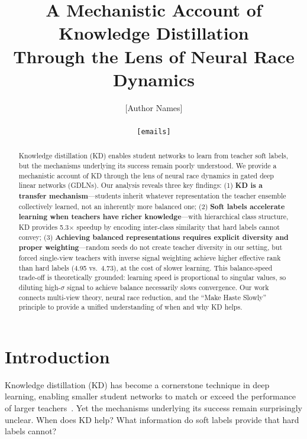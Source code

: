 \documentclass{article}
\title{A Mechanistic Account of Knowledge Distillation\\Through the Lens of Neural Race Dynamics}
\author{
[Author Names] \\
[Affiliations] \\
\texttt{[emails]}
}
\begin{document}
\maketitle

\begin{abstract}
Knowledge distillation (KD) enables student networks to learn from teacher soft labels, but the mechanisms underlying its success remain poorly understood. We provide a mechanistic account of KD through the lens of neural race dynamics in gated deep linear networks (GDLNs). Our analysis reveals three key findings: (1) \textbf{KD is a transfer mechanism}---students inherit whatever representation the teacher ensemble collectively learned, not an inherently more balanced one; (2) \textbf{Soft labels accelerate learning when teachers have richer knowledge}---with hierarchical class structure, KD provides 5.3$\times$ speedup by encoding inter-class similarity that hard labels cannot convey; (3) \textbf{Achieving balanced representations requires explicit diversity and proper weighting}---random seeds do not create teacher diversity in our setting, but forced single-view teachers with inverse signal weighting achieve higher effective rank than hard labels (4.95 vs.\ 4.73), at the cost of slower learning. This balance-speed trade-off is theoretically grounded: learning speed is proportional to singular values, so diluting high-$\sigma$ signal to achieve balance necessarily slows convergence. Our work connects multi-view theory, neural race reduction, and the ``Make Haste Slowly'' principle to provide a unified understanding of when and why KD helps.
\end{abstract}

\section{Introduction}

Knowledge distillation (KD) has become a cornerstone technique in deep learning, enabling smaller student networks to match or exceed the performance of larger teachers~\cite{hinton2015distilling}. Yet the mechanisms underlying its success remain surprisingly unclear. When does KD help? What information do soft labels provide that hard labels cannot?
\end{document}
